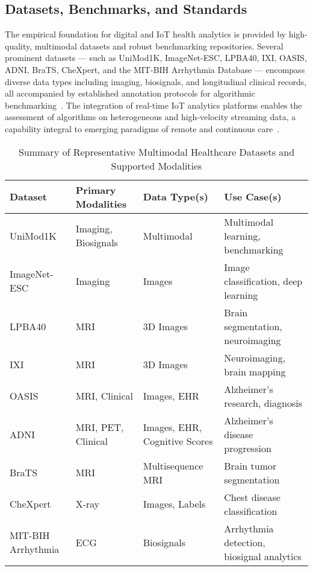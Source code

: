 \subsection{Datasets, Benchmarks, and Standards}

The empirical foundation for digital and IoT health analytics is provided by high-quality, multimodal datasets and robust benchmarking repositories. Several prominent datasets --- such as UniMod1K, ImageNet-ESC, LPBA40, IXI, OASIS, ADNI, BraTS, CheXpert, and the MIT-BIH Arrhythmia Database --- encompass diverse data types including imaging, biosignals, and longitudinal clinical records, all accompanied by established annotation protocols for algorithmic benchmarking~\cite{ref35,ref43,ref48,ref49,ref50,ref51,ref58,ref66,ref67,ref74,ref75,ref88,ref89,ref90,ref101,ref106}. The integration of real-time IoT analytics platforms enables the assessment of algorithms on heterogeneous and high-velocity streaming data, a capability integral to emerging paradigms of remote and continuous care~\cite{ref67,ref106}.

\begin{table*}[htbp]
\centering
\caption{Summary of Representative Multimodal Healthcare Datasets and Supported Modalities}
\label{tab:dataset_overview}
\begin{adjustbox}{max width=\textwidth}
\begin{tabular}{llll}
\toprule
\textbf{Dataset} & \textbf{Primary Modalities} & \textbf{Data Type(s)} & \textbf{Use Case(s)} \\
\midrule
UniMod1K & Imaging, Biosignals & Multimodal & Multimodal learning, benchmarking \\
ImageNet-ESC & Imaging & Images & Image classification, deep learning \\
LPBA40 & MRI & 3D Images & Brain segmentation, neuroimaging \\
IXI & MRI & 3D Images & Neuroimaging, brain mapping \\
OASIS & MRI, Clinical & Images, EHR & Alzheimer’s research, diagnosis \\
ADNI & MRI, PET, Clinical & Images, EHR, Cognitive Scores & Alzheimer’s disease progression \\
BraTS & MRI & Multisequence MRI & Brain tumor segmentation \\
CheXpert & X-ray & Images, Labels & Chest disease classification \\
MIT-BIH Arrhythmia & ECG & Biosignals & Arrhythmia detection, biosignal analytics \\
\bottomrule
\end{tabular}
\end{adjustbox}
\end{table*}

